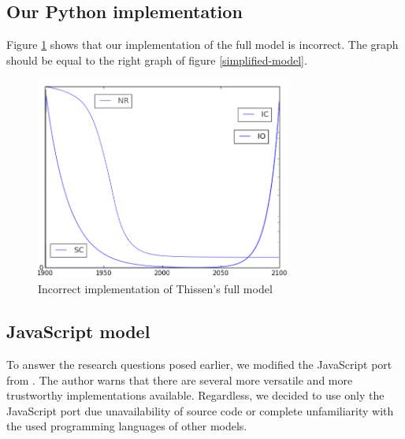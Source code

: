 \documentclass[10pt,a4paper]{scrartcl}
\begin{document}
\subsection*{Our Python implementation}

Figure \ref{fail} shows that our implementation of the full model is incorrect. The graph should be equal to the right graph of figure \ref{simplified-model}.

\begin{figure}
\centering
\includegraphics[width=0.75\textwidth]{./plaatjes/fail.png}
\caption{Incorrect implementation of Thissen's full model}
\label{fail}
\end{figure}

\subsection*{JavaScript model}

To answer the research questions posed earlier, we modified the JavaScript port from \cite{blogpost}. The author warns that there are several more versatile and more trustworthy implementations available. Regardless, we decided to use only the JavaScript port due unavailability of source code or complete unfamiliarity with the used programming languages of other models.
\end{document}
